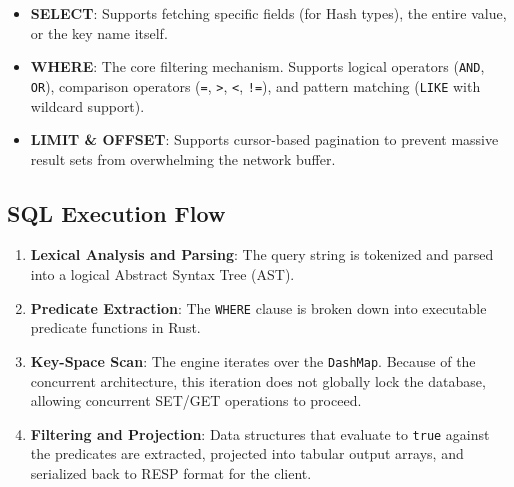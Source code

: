 \begin{itemize}[leftmargin=2.5em]
    \item \textbf{SELECT}: Supports fetching specific fields (for Hash types), the entire value, or the key name itself.
    \item \textbf{WHERE}: The core filtering mechanism. Supports logical operators (\texttt{AND}, \texttt{OR}), comparison operators (\texttt{=}, \texttt{>}, \texttt{<}, \texttt{!=}), and pattern matching (\texttt{LIKE} with wildcard support).
    \item \textbf{LIMIT \& OFFSET}: Supports cursor-based pagination to prevent massive result sets from overwhelming the network buffer.
\end{itemize}

\subsection{SQL Execution Flow}
\begin{enumerate}[leftmargin=2.5em]
    \item \textbf{Lexical Analysis and Parsing}: The query string is tokenized and parsed into a logical Abstract Syntax Tree (AST).
    \item \textbf{Predicate Extraction}: The \texttt{WHERE} clause is broken down into executable predicate functions in Rust.
    \item \textbf{Key-Space Scan}: The engine iterates over the \texttt{DashMap}. Because of the concurrent architecture, this iteration does not globally lock the database, allowing concurrent SET/GET operations to proceed.
    \item \textbf{Filtering and Projection}: Data structures that evaluate to \texttt{true} against the predicates are extracted, projected into tabular output arrays, and serialized back to RESP format for the client.
\end{enumerate}

